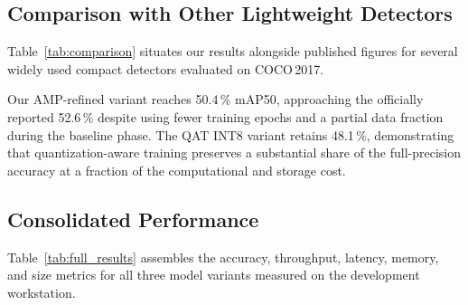 \documentclass[conference]{IEEEtran}
\begin{document}
\subsection{Comparison with Other Lightweight Detectors}

Table~\ref{tab:comparison} situates our results alongside published figures for several widely used compact detectors evaluated on COCO\,2017.

\begin{table}[htbp]
\caption{Comparison with Lightweight Detectors (COCO\,2017 Val)}
\label{tab:comparison}
\begin{center}
\end{center}
\end{table}

Our AMP-refined variant reaches 50.4\,\% mAP50, approaching the officially reported 52.6\,\% despite using fewer training epochs and a partial data fraction during the baseline phase. The QAT INT8 variant retains 48.1\,\%, demonstrating that quantization-aware training preserves a substantial share of the full-precision accuracy at a fraction of the computational and storage cost.

\subsection{Consolidated Performance}

Table~\ref{tab:full_results} assembles the accuracy, throughput, latency, memory, and size metrics for all three model variants measured on the development workstation.
\end{document}
